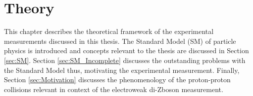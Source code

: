 \part{\LARGE{Theory}}
\label{sec:theory}

This chapter describes the theoretical framework of the experimental measurements discussed in this thesis. The Standard Model (SM) of particle physics is introduced and concepts relevant to the thesis are discussed in Section \ref{sec:SM}. Section \ref{sec:SM_Incomplete} discusses the outstanding problems with the Standard Model thus, motivating the experimental measurement. Finally, Section \ref{sec:Motivation} discusses the phenomenology of the proton-proton collisions relevant in context of the electroweak di-Zboson measurement.

